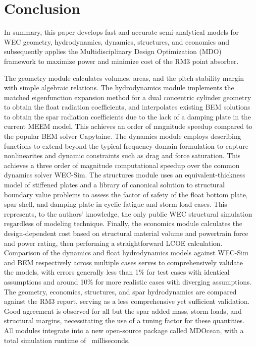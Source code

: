 \documentclass[preprint,12pt]{elsarticle}
\begin{document}


\clearpage

\clearpage

\clearpage

\clearpage


\section{Conclusion}
In summary, this paper develops fast and accurate semi-analytical models for WEC geometry, hydrodynamics, dynamics, structures, and economics and subsequently applies the Multidisciplinary Design Optimization (MDO) framework to maximize power and minimize cost of the RM3 point absorber. 

The geometry module calculates volumes, areas, and the pitch stability margin with simple algebraic relations.
The hydrodynamics module implements the matched eigenfunction expansion method for a dual concentric cylinder geometry to obtain the float radiation coefficients, and interpolates existing BEM solutions to obtain the spar radiation coefficients due to the lack of a damping plate in the current MEEM model.
This achieves an order of magnitude speedup compared to the popular BEM solver Capytaine.
The dynamics module employs describing functions to extend beyond the typical frequency domain formulation to capture nonlinearites and dynamic constraints such as drag and force saturation.
This achieves a three order of magnitude computational speedup over the common dynamics solver WEC-Sim.
The structures module uses an equivalent-thickness model of stiffened plates and a library of canonical solution to structural boundary value problems to assess the factor of safety of the float bottom plate, spar shell, and damping plate in cyclic fatigue and storm load cases.
This represents, to the authors' knowledge, the only public WEC structural simulation regardless of modeling technique.
Finally, the economics module calculates the design-dependent cost based on structural material volume and powertrain force and power rating, then performing a straightforward LCOE calculation.
Comparison of the dynamics and float hydrodynamics models against WEC-Sim and BEM respectively across multiple cases serves to comprehensively validate the models, with errors generally less than 1\% for test cases with identical assumptions and around 10\% for more realistic cases with diverging assumptions.
The geometry, economics, structures, and spar hydrodynamics are compared against the RM3 report, serving as a less comprehensive yet sufficient validation.
Good agreement is observed for all but the spar added mass, storm loads, and structural margins, necessitating the use of a tuning factor for these quantities.
All modules integrate into a new open-source package called MDOcean, with a total simulation runtime of \simRuntime~milliseconds.
\end{document}
